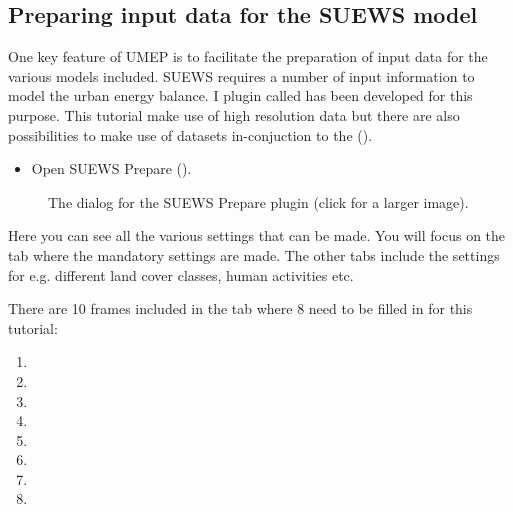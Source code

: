 \documentclass[letterpaper,10pt,english]{sphinxmanual}
\begin{document}
\subsection{Preparing input data for the SUEWS model}
\label{\detokenize{Tutorials/SuewsSpatial:preparing-input-data-for-the-suews-model}}
One key feature of UMEP is to facilitate the preparation of input data for the various models included. SUEWS requires a number of input information to model the urban energy balance. I plugin called  has been developed for this purpose. This tutorial make use of high resolution data but there are also possibilities to make use of  datasets in-conjuction to the  ().
\begin{itemize}
\item {} 
Open SUEWS Prepare ().

\end{itemize}

\begin{figure}[htbp]
\centering
\capstart

\noindent{}
\caption{The dialog for the SUEWS Prepare plugin (click for a larger image).}\label{\detokenize{Tutorials/SuewsSpatial:id10}}\end{figure}

Here you can see all the various settings that can be made. You will focus on the  tab where the mandatory settings are made. The other tabs include the settings for e.g. different land cover classes, human activities etc.

There are 10 frames included in the  tab where 8 need to be filled in for this tutorial:
\begin{enumerate}
\item {} 

\item {} 

\item {} 

\item {} 

\item {} 

\item {} 

\item {} 

\item {} 

\end{enumerate}
\end{document}

